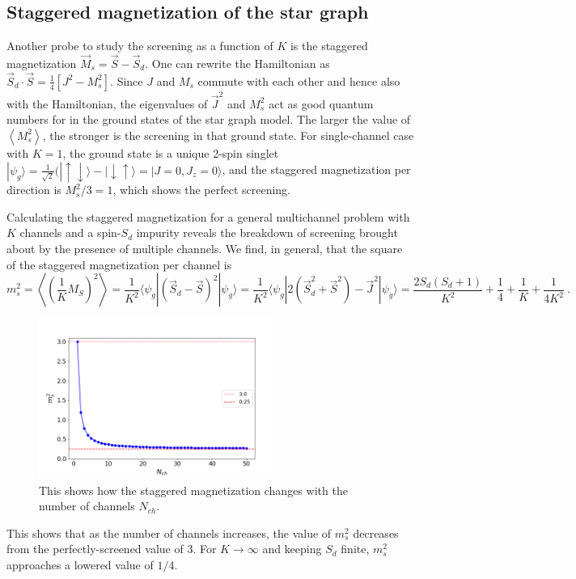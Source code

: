 \documentclass[reprint,onecolumn,prb,superscriptaddress]{revtex4-2}
\begin{document}
\subsection{Staggered magnetization of the star graph}
 Another probe to study the screening as a function of \(K\) is the staggered magnetization \(\vec{M}_s=\vec{S}-\vec{S}_d\). One can rewrite the Hamiltonian as $\vec{S}_d\cdot\vec{S}= \frac{1}{4}[J^2 - M_s^2]$. Since \(J\) and \(M_s\) commute with each other and hence also with the Hamiltonian, the eigenvalues of $\vec{J}^2$ and \(M_s^2\) act as good quantum numbers for in the ground states of the star graph model. The larger the value of \(\left<M_s^2\right>\), the stronger is the screening in that ground state. For single-channel case with $K=1$, the ground state is a unique 2-spin singlet $|\psi_g\rangle =\frac{1}{\sqrt{2}} (|\uparrow\downarrow\rangle-|\downarrow\uparrow\rangle = |J=0,J_z=0\rangle$, and the staggered magnetization per direction is \(M_s^2/3 = 1\), which shows the perfect screening.

Calculating the staggered magnetization for a general multichannel problem with \(K\) channels and a spin-\(S_d\) impurity reveals the breakdown of screening brought about by the presence of multiple channels. We find, in general, that the square of the staggered magnetization per channel is
\begin{equation}
	m_s^2 = \left< \left(\frac{1}{K}M_S\right)^2\right> = \frac{1}{K^2}\langle \psi_g | (\vec{S}_d - \vec{S})^2 |\psi_g\rangle = \frac{1}{K^2}\langle \psi_g | 2(\vec{S}_d^2 + \vec{S}^2)-\vec{J}^2 |\psi_g\rangle = \frac{2S_d(S_d+1)}{K^2}+\frac{1}{4}+\frac{1}{K}+\frac{1}{4K^2}~.
\end{equation}

\begin{figure}
\includegraphics[width=0.7\textwidth]{Staggeredmag50.png}
\caption{This shows how the staggered magnetization changes with the number of channels $N_{ch}$.}
\label{fig:st_mag}
\end{figure}
This shows that as the number of channels increases, the value of \(m_s^2\) decreases from the perfectly-screened value of 3. For \(K \to \infty\) and keeping \(S_d\) finite, \(m_s^2\) approaches a lowered value of \(1/4\).
\end{document}

